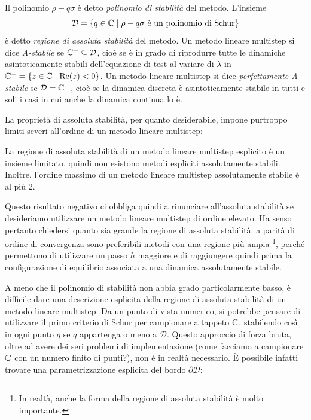 \begin{defi}
Il polinomio $\rho - q\sigma$ è detto \emph{polinomio di stabilità} del metodo.
L'insieme
\[
\mathcal{D} = \{ q \in \mathbb{C} \mid \rho - q \sigma \text{ è un polinomio di Schur} \}
\]
è detto \emph{regione di assoluta stabilità} del metodo.
Un metodo lineare multistep si dice \emph{A-stabile} se
$\mathbb{C}^- \subseteq \mathcal{D}$, cioè se è in grado di riprodurre tutte le
dinamiche asintoticamente stabili dell'equazione di test al variare
di $\lambda$ in $\mathbb{C}^- = \{ z \in \mathbb{C} \mid \operatorname{Re}(z) < 0 \}$.
Un metodo lineare multistep si dice \emph{perfettamente A-stabile}
se $\mathcal{D} = \mathbb{C}^-$, cioè se la dinamica discreta è asintoticamente
stabile in tutti e soli i casi in cui anche la dinamica continua lo è.
\end{defi}

\noindent La proprietà di assoluta stabilità, per quanto desiderabile,
impone purtroppo limiti severi all'ordine di un metodo lineare multistep:

\begin{teor} \label{teor:seconda-barriera-dahlquist}
La regione di assoluta stabilità di un metodo lineare multistep
esplicito è un insieme limitato, quindi non esistono metodi espliciti
assolutamente stabili. Inoltre, l'ordine massimo di un metodo lineare
multistep assolutamente stabile è al più 2.
\end{teor}

\noindent Questo risultato negativo ci obbliga quindi a rinunciare
all'assoluta stabilità se desideriamo utilizzare un metodo lineare
multistep di ordine elevato. Ha senso pertanto chiedersi quanto sia
grande la regione di assoluta stabilità: a parità di ordine di
convergenza sono preferibili metodi con una regione più ampia%
\footnote{In realtà, anche la forma della regione di assoluta
stabilità è molto importante.}, perché permettono di utilizzare un passo $h$
maggiore e di raggiungere quindi prima la configurazione di equilibrio
associata a una dinamica assolutamente stabile.

A meno che il polinomio di stabilità non abbia grado particolarmente basso,
è difficile dare una descrizione esplicita della regione di assoluta stabilità
di un metodo lineare multistep. Da un punto di vista numerico,
si potrebbe pensare di utilizzare il primo criterio di Schur
per campionare a tappeto $\mathbb{C}$, stabilendo così in ogni punto $q$
se $q$ appartenga o meno a $\mathcal{D}$. Questo approccio di forza bruta,
oltre ad avere dei seri problemi di implementazione (come facciamo a
campionare $\mathbb{C}$ con un numero finito di punti?), non è in realtà necessario.
È possibile infatti trovare una parametrizzazione esplicita del
bordo $\partial \mathcal{D}$:


